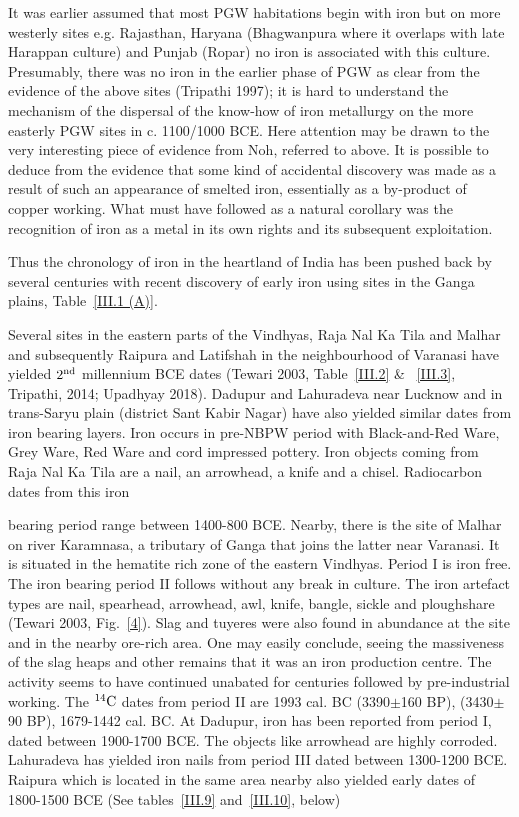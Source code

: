 It was earlier assumed that most PGW habitations begin with iron but on more westerly sites e.g. Rajasthan, Haryana (Bhagwanpura where it overlaps with late Harappan culture) and Punjab (Ropar) no iron is associated with this culture. Presumably, there was no iron in the earlier phase of PGW as clear from the evidence of the above sites (Tripathi 1997); it is hard to understand the mechanism of the dispersal of the know-how of iron metallurgy on the more easterly PGW sites in c. 1100/1000 BCE. Here attention may be drawn to the very interesting piece of evidence from Noh, referred to above. It is possible to deduce from the evidence that some kind of accidental discovery was made as a result of such an appearance of smelted iron, essentially as a by-product of copper working. What must have followed as a natural corollary was the recognition of iron as a metal in its own rights and its subsequent exploitation.

Thus the chronology of iron in the heartland of India has been pushed back by several centuries with recent discovery of early iron using sites in the Ganga plains, Table~\ref{III.1 (A)}.

Several sites in the eastern parts of the Vindhyas, Raja Nal Ka Tila and Malhar and subsequently Raipura and Latifshah in the neighbourhood of  Varanasi have yielded $2^{\rm nd}$ millennium BCE dates (Tewari 2003, Table~\ref{III.2} \& ~\ref{III.3}, Tripathi, 2014; Upadhyay 2018). Dadupur and Lahuradeva near Lucknow and in trans-Saryu plain (district Sant Kabir Nagar) have also yielded similar dates from iron bearing layers. Iron occurs in pre-NBPW period with Black-and-Red Ware, Grey Ware, Red Ware and cord impressed pottery. Iron objects coming from Raja Nal Ka Tila are a nail, an arrowhead, a knife and a chisel. Radiocarbon dates from this iron 

bearing period range between 1400-800 BCE. Nearby, there is the site of Malhar on river Karamnasa, a tributary of Ganga that joins the latter near Varanasi. It is situated in the hematite rich zone of the eastern Vindhyas. Period I is iron free. The iron bearing period II follows without any break in culture. The iron artefact types are nail, spearhead, arrowhead, awl, knife, bangle, sickle and ploughshare (Tewari 2003, Fig.~\ref{4}). Slag and tuyeres were also found in abundance at the site and in the nearby ore-rich area. One may easily conclude, seeing the massiveness of the slag heaps and other remains that it was an iron production centre. The activity seems to have continued unabated for centuries followed by pre-industrial working. The $^{14}{\rm C}$ dates from period II are 1993 cal. BC (3390$\pm$160 BP), (3430$\pm$90 BP), 1679-1442 cal. BC. At Dadupur, iron has been reported from period I, dated between 1900-1700 BCE. The objects like arrowhead are highly corroded. Lahuradeva has yielded iron nails from period III dated between 1300-1200 BCE.   Raipura which is located in the same area nearby also yielded early dates of 1800-1500 BCE (See tables~\ref{III.9} and~\ref{III.10}, below)

